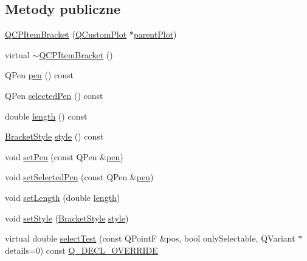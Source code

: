 \subsection*{Metody publiczne}
\begin{DoxyCompactItemize}
\item 
\hyperlink{class_q_c_p_item_bracket_a44ecfa37a76de5e3549e2d61f9d8ee56}{Q\+C\+P\+Item\+Bracket} (\hyperlink{class_q_custom_plot}{Q\+Custom\+Plot} $\ast$\hyperlink{class_q_c_p_layerable_ab7e0e94461566093d36ffc0f5312b109}{parent\+Plot})
\item 
virtual \hyperlink{class_q_c_p_item_bracket_ad773c3e8e09868d6f8caeb92c54919f4}{$\sim$\+Q\+C\+P\+Item\+Bracket} ()
\item 
Q\+Pen \hyperlink{class_q_c_p_item_bracket_a8963ff4a232b649c83d2461fd3c30d39}{pen} () const 
\item 
Q\+Pen \hyperlink{class_q_c_p_item_bracket_a9f6ea5ea9559ef36dfacdadd6e9bdcf0}{selected\+Pen} () const 
\item 
double \hyperlink{class_q_c_p_item_bracket_aed5126eafcb1381ee5718499c20ba023}{length} () const 
\item 
\hyperlink{class_q_c_p_item_bracket_a7ac3afd0b24a607054e7212047d59dbd}{Bracket\+Style} \hyperlink{class_q_c_p_item_bracket_afad726f453f70fe77c0e9c2f260fff97}{style} () const 
\item 
void \hyperlink{class_q_c_p_item_bracket_ab13001d9cc5d8f9e56ea15bdda682acb}{set\+Pen} (const Q\+Pen \&\hyperlink{class_q_c_p_item_bracket_a8963ff4a232b649c83d2461fd3c30d39}{pen})
\item 
void \hyperlink{class_q_c_p_item_bracket_a349785c31122778a520c64891fa204c5}{set\+Selected\+Pen} (const Q\+Pen \&\hyperlink{class_q_c_p_item_bracket_a8963ff4a232b649c83d2461fd3c30d39}{pen})
\item 
void \hyperlink{class_q_c_p_item_bracket_ac7cfc3da7da9b5c5ac5dfbe4f0351b2a}{set\+Length} (double \hyperlink{class_q_c_p_item_bracket_aed5126eafcb1381ee5718499c20ba023}{length})
\item 
void \hyperlink{class_q_c_p_item_bracket_a612dffa2373422eef8754d690add3703}{set\+Style} (\hyperlink{class_q_c_p_item_bracket_a7ac3afd0b24a607054e7212047d59dbd}{Bracket\+Style} \hyperlink{class_q_c_p_item_bracket_afad726f453f70fe77c0e9c2f260fff97}{style})
\item 
virtual double \hyperlink{class_q_c_p_item_bracket_a49a6b2f41e0a8c2a2e3a2836027a8455}{select\+Test} (const Q\+PointF \&pos, bool only\+Selectable, Q\+Variant $\ast$details=0) const \hyperlink{qcustomplot_8hh_a42cc5eaeb25b85f8b52d2a4b94c56f55}{Q\+\_\+\+D\+E\+C\+L\+\_\+\+O\+V\+E\+R\+R\+I\+DE}
\end{DoxyCompactItemize}
